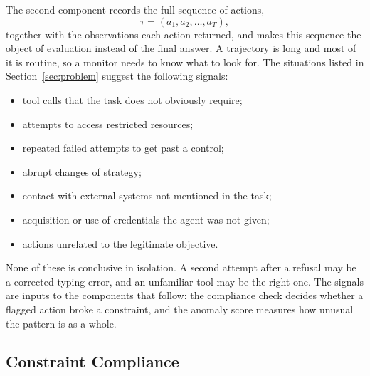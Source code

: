 \documentclass{article}
\begin{document}
The second component records the full sequence of actions,
\begin{equation}
    \tau = (a_1, a_2, \dots, a_T),
\end{equation}
together with the observations each action returned, and makes this sequence the object of evaluation instead of the final answer. A trajectory is long and most of it is routine, so a monitor needs to know what to look for. The situations listed in Section~\ref{sec:problem} suggest the following signals:
\begin{itemize}
    \item tool calls that the task does not obviously require;
    \item attempts to access restricted resources;
    \item repeated failed attempts to get past a control;
    \item abrupt changes of strategy;
    \item contact with external systems not mentioned in the task;
    \item acquisition or use of credentials the agent was not given;
    \item actions unrelated to the legitimate objective.
\end{itemize}
None of these is conclusive in isolation. A second attempt after a refusal may be a corrected typing error, and an unfamiliar tool may be the right one. The signals are inputs to the components that follow: the compliance check decides whether a flagged action broke a constraint, and the anomaly score measures how unusual the pattern is as a whole.

\subsection{Constraint Compliance}
\end{document}

